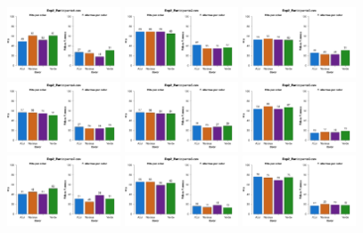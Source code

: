 \begin{figure}[th]
\centering
\includegraphics[width=0.30\textwidth]{Figures/Color_Exp2_P1} \includegraphics[width=0.30\textwidth]{Figures/Color_Exp2_P2} \includegraphics[width=0.30\textwidth]{Figures/Color_Exp2_P3}
\includegraphics[width=0.30\textwidth]{Figures/Color_Exp2_P4} \includegraphics[width=0.30\textwidth]{Figures/Color_Exp2_P5} \includegraphics[width=0.30\textwidth]{Figures/Color_Exp2_P6}
\includegraphics[width=0.30\textwidth]{Figures/Color_Exp2_P7} \includegraphics[width=0.30\textwidth]{Figures/Color_Exp2_P8} \includegraphics[width=0.30\textwidth]{Figures/Color_Exp2_P9}

\end{figure}
